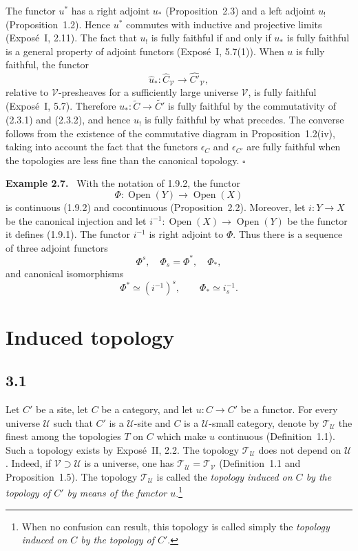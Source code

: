 \documentclass[11pt]{article}
\newcommand{\U}{\mathcal{U}}
\newcommand{\V}{\mathcal{V}}
\newcommand{\T}{\mathcal{T}}
\newcommand{\Ouv}{\operatorname{Open}}
\newcommand{\qedtext}{\hfill\(\square\)}
\newenvironment{remarktext}[1]{\par\medskip\noindent\textbf{#1.}\ }{\par\medskip}
\begin{document}
The functor \(u^{\ast}\) has a right adjoint \(u_{\ast}\) (Proposition~2.3) and a left adjoint \(u_!\) (Proposition~1.2). Hence \(u^{\ast}\) commutes with inductive and projective limits (Expos\'e~I, 2.11). The fact that \(u_!\) is fully faithful if and only if \(u_{\ast}\) is fully faithful is a general property of adjoint functors (Expos\'e~I, 5.7(1)). When \(u\) is fully faithful, the functor
\[
\widehat u_{\ast}:\widehat C_{\V}\to\widehat{C'}_{\V},
\]
relative to \(\V\)-presheaves for a sufficiently large universe \(\V\), is fully faithful (Expos\'e~I, 5.7). Therefore \(u_{\ast}:\widetilde C\to\widetilde{C'}\) is fully faithful by the commutativity of (2.3.1) and (2.3.2), and hence \(u_!\) is fully faithful by what precedes. The converse follows from the existence of the commutative diagram in Proposition~1.2(iv), taking into account the fact that the functors \(\epsilon_C\) and \(\epsilon_{C'}\) are fully faithful when the topologies are less fine than the canonical topology. \qedtext

\begin{remarktext}{Example 2.7}
With the notation of 1.9.2, the functor
\[
\Phi:\Ouv(Y)\to\Ouv(X)
\]
is continuous (1.9.2) and cocontinuous (Proposition~2.2). Moreover, let \(i:Y\to X\) be the canonical injection and let \(i^{-1}:\Ouv(X)\to\Ouv(Y)\) be the functor it defines (1.9.1). The functor \(i^{-1}\) is right adjoint to \(\Phi\). Thus there is a sequence of three adjoint functors
\[
\Phi^s,\quad \Phi_s=\Phi^{\ast},\quad \Phi_{\ast},
\]
and canonical isomorphisms
\[
\Phi^{\ast}\simeq (i^{-1})^s,
\qquad
\Phi_{\ast}\simeq i^{-1}_s.
\]
\end{remarktext}

\section{Induced topology}

\subsection*{3.1}
Let \(C'\) be a site, let \(C\) be a category, and let \(u:C\to C'\) be a functor. For every universe \(\U\) such that \(C'\) is a \(\U\)-site and \(C\) is a \(\U\)-small category, denote by \(\T_{\U}\) the finest among the topologies \(T\) on \(C\) which make \(u\) continuous (Definition~1.1). Such a topology exists by Expos\'e~II, 2.2. The topology \(\T_{\U}\) does not depend on \(\U\). Indeed, if \(\V\supset\U\) is a universe, one has \(\T_{\U}=\T_{\V}\) (Definition~1.1 and Proposition~1.5). The topology \(\T_{\U}\) is called the \emph{topology induced on \(C\) by the topology of \(C'\) by means of the functor \(u\)}.\footnote{When no confusion can result, this topology is called simply the \emph{topology induced on \(C\) by the topology of \(C'\)}.}
\end{document}
